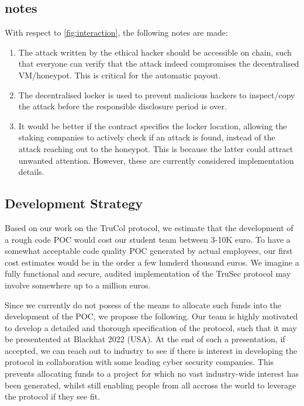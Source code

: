 \subsection{ notes}
With respect to \cref{fig:interaction}, the following notes are made:
\begin{enumerate} 
    \item The attack written by the ethical hacker should be accessible on chain, such that everyone can verify that the attack indeed compromises the decentralised VM/honeypot. This is critical for the automatic payout.
    \item The decentralised locker is used to prevent malicious hackers to inspect/copy the attack before the responsible disclosure period is over.
    \item It would be better if the contract specifies the locker location, allowing the staking companies to actively check if an attack is found, instead of the attack reaching out to the honeypot. This is because the latter could attract unwanted attention. However, these are currently considered implementation details.
\end{enumerate}


\subsection{Development Strategy}
Based on our work on the TruCol protocol, we estimate that the development of a rough code POC would cost our student team between 3-10K euro. To have a somewhat acceptable code quality POC generated by actual employees, our first cost estimates would be in the order a few hunderd thousand euros. We imagine a fully functional and secure, audited implementation of the TruSec protocol may involve somewhere up to a million euros. 

Since we currently do not posess of the means to allocate such funds into the development of the POC, we propose the following. Our team is highly motivated to develop a detailed and thorough specification of the protocol, such that it may be presentented at Blackhat 2022 (USA). At the end of such a presentation, if accepted, we can reach out to industry to see if there is interest in developing the protocol in collaboration with some leading cyber security companies. This prevents allocating funds to a project for which no vast industry-wide interest has been generated, whilst still enabling people from all accross the world to leverage the protocol if they see fit.